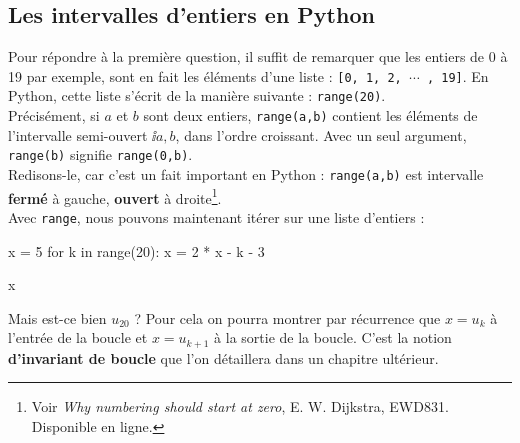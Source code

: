 \subsection{Les intervalles d'entiers en Python}

Pour répondre à la première question, il suffit de remarquer que les entiers de 0 à 19 par exemple, 
sont en fait les éléments d'une liste : \texttt{[0, 1, 2, $\cdots$ , 19]}. En Python, cette liste 
s'écrit de la manière suivante : \texttt{range(20)}.\\
Précisément, si $a$ et $b$ sont deux entiers, \texttt{range(a,b)} contient les éléments de 
l'intervalle semi-ouvert $\ii{a,b}$, dans l'ordre croissant. Avec un seul argument, 
\texttt{range(b)} signifie \texttt{range(0,b)}.\\
Redisons-le, car c'est un fait important en Python : \texttt{range(a,b)} est intervalle 
\textbf{fermé} à gauche, \textbf{ouvert} à
droite\footnote{Voir \textit{Why numbering should start at zero}, E. W. Dijkstra,
  EWD831. Disponible en ligne.}.\\
  
Avec \texttt{range}, nous pouvons maintenant itérer sur une liste d'entiers :

\begin{pyconsole}
x = 5
for k in range(20):
    x = 2 * x - k - 3
  
x
\end{pyconsole}

\begin{rem}
Mais est-ce bien $u_{20}$ ? Pour cela on pourra montrer par récurrence que $x=u_k$ à l'entrée de la boucle et $x=u_{k+1}$ à la sortie de la boucle. C'est la notion \textbf{d'invariant de boucle} que l'on détaillera dans un chapitre ultérieur.
\end{rem}

